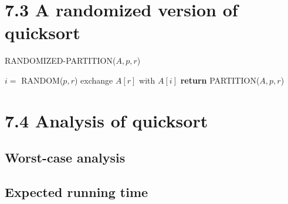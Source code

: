 \documentclass[a4paper]{article}
\begin{document}
\section*{7.3 A randomized version of quicksort}
\begin{algorithm}[H]%
    \caption{RANDOMIZED-PARTITION($A,p,r$)}
    \begin{algorithmic}[1] %
        \State $i=$ RANDOM($p,r$)
        \State exchange $A[r]$ with $A[i]$
        \State \textbf{return }PARTITION($A,p,r$)
    \end{algorithmic}
\end{algorithm}
\section*{7.4 Analysis of quicksort}
\subsection*{Worst-case analysis}
\subsection*{Expected running time}
\end{document}
